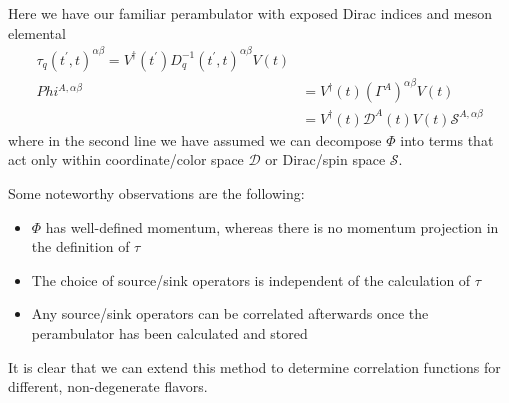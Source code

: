 Here we have our familiar perambulator with exposed Dirac indices and meson elemental
\begin{align}
    \tau_q(t^\prime, t)^{\alpha \beta} = V^\dagger(t^\prime) D^{-1}_q(t^\prime, t)^{\alpha \beta} V(t) \\
    Phi^{A, \alpha\beta} 
&= V^\dagger(t) (\Gamma^A)^{\alpha \beta} V(t) \\
&= V^\dagger(t) \mathcal D^A(t)V(t) \mathcal S^{A, \alpha \beta}
\end{align}
where in the second line we have assumed we can decompose $\Phi$ into  terms that act only within coordinate/color space $\mathcal D$ or Dirac/spin space $\mathcal S$.

Some noteworthy observations are the following: 
\begin{itemize}
    \item $\Phi$ has well-defined momentum, whereas there is no momentum projection in the definition of $\tau$ 
    \item The choice of source/sink operators is independent of the calculation of $\tau$
	\item Any source/sink operators can be correlated afterwards once the perambulator has been calculated and stored
\end{itemize}
It is clear that we can extend this method to determine correlation functions for different, non-degenerate flavors.


